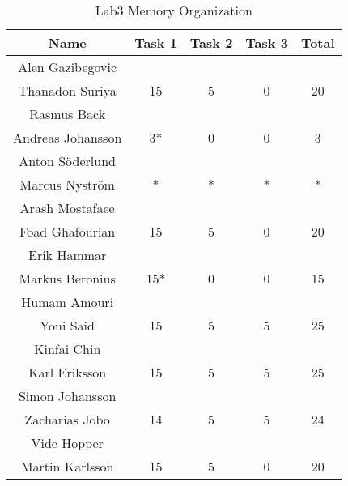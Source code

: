 \documentclass{article}
\begin{document}
\begin{table}[ht]
\caption{Lab3 Memory Organization}
\centering
\begin{tabular}{c c c c c} 
\hline\hline 
Name & Task 1 & Task 2 & Task 3 & Total \\ [0.5ex] 
\hline
Alen Gazibegovic \\ Thanadon Suriya 
& 15 & 5 & 0 & 20 \\
\hline
Rasmus Back \\ Andreas Johansson 
& 3* & 0 & 0 & 3 \\
\hline 
Anton Söderlund \\ Marcus Nyström
& * & * & * & * \\
\hline
Arash Mostafaee \\ Foad Ghafourian
& 15 & 5 & 0 & 20 \\
\hline
Erik Hammar \\ Markus Beronius
& 15* & 0 & 0 & 15 \\
\hline 
Humam Amouri \\ Yoni Said
& 15 & 5 & 5 & 25 \\ 
\hline
Kinfai Chin \\ Karl Eriksson
& 15 & 5 & 5 & 25 \\ 
\hline
Simon Johansson \\ Zacharias Jobo
& 14 & 5 & 5 & 24 \\
\hline
Vide Hopper \\ Martin Karlsson
& 15 & 5 & 0 & 20 \\ [1ex]
\hline
\end{tabular}
\label{table:nonlin}
\end{table}


\end{document}

